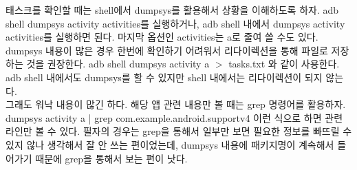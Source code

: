 태스크를 확인할 때는 shell에서 dumpsys를 활용해서 상황을 이해하도록 하자.
adb shell dumpsys activity activities를 실행하거나, adb shell 내에서 dumpsys activity activities를 실행하면 된다. 마지막 옵션인 activities는 a로 줄여 쓸 수도 있다.\\

dumpsys 내용이 많은 경우 한번에 확인하기 어려워서 리다이렉션을 통해 파일로 저장하는 것을 권장한다. adb shell dumpsys activity a  $>$ tasks.txt 와 같이 사용한다. 
adb shell 내에서도 dumpsys를 할 수 있지만 shell 내에서는 리다이렉션이 되지 않는다.\\

그래도 워낙 내용이 많긴 하다. 해당 앱 관련 내용만 볼 때는 grep 명령어를 활용하자. dumpsys activity a | grep com.example.android.supportv4 이런 식으로 하면 관련 라인만 볼 수 있다. 
필자의 경우는 grep을 통해서 일부만 보면 필요한 정보를 빠뜨릴 수 있지 않나 생각해서 잘 안 쓰는 편이었는데, dumpsys 내용에 패키지명이 계속해서 들어가기 때문에 grep을 통해서 보는 편이 낫다.\\


